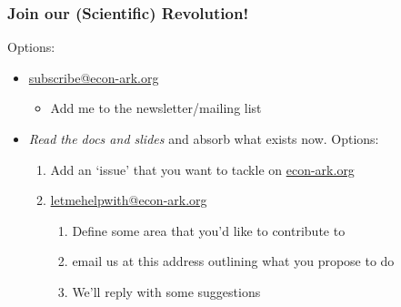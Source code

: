 \documentclass[public]{beamer}
\providecommand{\ARK}{\href{http://econ-ark.org}{econ-ark.org}}
\begin{document}
\begin{frame}
\frametitle{Join our (Scientific) Revolution!}

\providecommand{\subscribe}{\href{mailto:subscribe@econ-ark.org}{subscribe@econ-ark.org}}
\providecommand{\letmehelpwith}{\href{mailto:letmehelpwith@econ-ark.org}{letmehelpwith@econ-ark.org}}
Options:
\begin{itemize}
\item \subscribe
\begin{itemize}
\item Add me to the newsletter/mailing list
\end{itemize}
\item {\it Read the docs and slides} and absorb what exists now.  Options:
\begin{enumerate}
\item Add an `issue' that you want to tackle on \ARK
\item \letmehelpwith
\begin{enumerate}
\item Define some area that you'd like to contribute to
\item email us at this address outlining what you propose to do
\item We'll reply with some suggestions
\end{enumerate}
\end{enumerate}
\end{itemize}

\end{frame}
\end{document}
